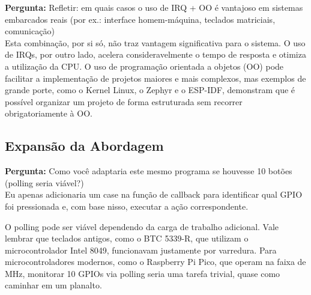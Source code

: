 \documentclass{article}
\begin{document}
\noindent
\textbf{Pergunta:} Refletir: em quais casos o uso de IRQ + OO é vantajoso em sistemas embarcados reais (por ex.: interface homem-máquina, teclados matriciais, comunicação) \\

\noindent
Esta combinação, por si só, não traz vantagem significativa para o sistema. O uso de IRQs, por outro lado, acelera consideravelmente o tempo de resposta e otimiza a utilização da CPU. O uso de programação orientada a objetos (OO) pode facilitar a implementação de projetos maiores e mais complexos, mas exemplos de grande porte, como o Kernel Linux, o Zephyr e o ESP-IDF, demonstram que é possível organizar um projeto de forma estruturada sem recorrer obrigatoriamente à OO. \\

\subsection{Expansão da Abordagem}

\noindent
\textbf{Pergunta:} Como você adaptaria este mesmo programa se houvesse 10 botões (polling seria viável?) \\

Eu apenas adicionaria um case na função de callback para identificar qual GPIO foi pressionada e, com base nisso, executar a ação correspondente.

O polling pode ser viável dependendo da carga de trabalho adicional. Vale lembrar que teclados antigos, como o BTC 5339-R, que utilizam o microcontrolador Intel 8049, funcionavam justamente por varredura. Para microcontroladores modernos, como o Raspberry Pi Pico, que operam na faixa de MHz, monitorar 10 GPIOs via polling seria uma tarefa trivial, quase como caminhar em um planalto.
\end{document}
